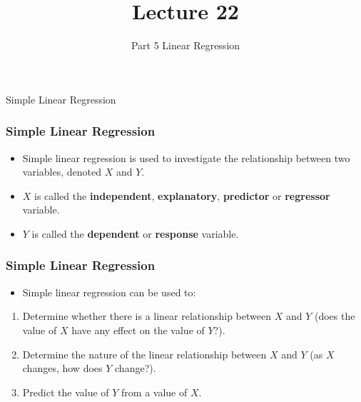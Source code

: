 \documentclass[12pt]{beamer}
\title[ECON2843]{Lecture 22}
\subtitle{Part 5 Linear Regression}
\date{}
\begin{document}
	\begin{frame}
		\titlepage
		
	\end{frame}
	\begin{frame}
		\vspace{1cm}
		\centering
		{\color{blue}\large Simple Linear Regression}
	\end{frame}


	\begin{frame}
		\frametitle{\color{blue}Simple Linear Regression}
		
		\vspace{1cm}
		
		\begin{itemize}[label={\color{blue}$\blacktriangleright$}]
			\item Simple linear regression is used to investigate the relationship between two variables, denoted $X$ and $Y$.
			
			\vspace{0.5cm}
			
			\item $X$ is called the \textbf{independent}, \textbf{explanatory}, \textbf{predictor} or \textbf{regressor} variable.
			
			\vspace{0.5cm}
			
			\item $Y$ is called the \textbf{dependent} or \textbf{response} variable.
		\end{itemize}
		
	\end{frame}
\begin{frame}
	\frametitle{\color{blue}Simple Linear Regression}
	
	
	\begin{itemize}[label={\color{blue}$\blacktriangleright$}]
		\item Simple linear regression can be used to:
	\end{itemize}
	
	\begin{enumerate}[label={\color{blue}\arabic{enumi}}.]
		\item Determine whether there is a linear relationship between $X$ and $Y$ (does the value of $X$ have any effect on the value of $Y$?).
		
		\item Determine the nature of the linear relationship between $X$ and $Y$ (as $X$ changes, how does $Y$ change?).
		
		\item {\color{red}Predict the value of $Y$ from a value of $X$.}
	\end{enumerate}
	
\end{frame}
\end{document}
